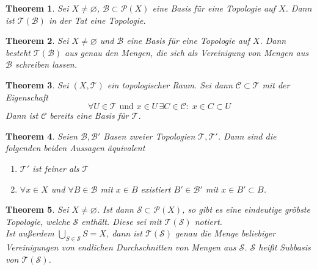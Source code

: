 \documentclass[a4paper, 12pt]{article}
\theoremstyle{plain}
\newtheorem{theorem}{Theorem}[section] %
\theoremstyle{definition}
\theoremstyle{lemma}
\theoremstyle{remark}
\theoremstyle{corollary}
\theoremstyle{example}
\begin{document}
	\begin{theorem}
		Sei $X \neq \varnothing$, $\mathcal{B} \subset \mathcal{P}(X)$ eine Basis für eine Topologie auf $X$. Dann ist $\mathcal{T}(\mathcal{B})$ in der Tat eine Topologie.
	\end{theorem}
	\begin{theorem}
		Sei $X \neq \varnothing$ und $\mathcal{B}$ eine Basis für eine Topologie auf $X$. Dann besteht $\mathcal{T}(\mathcal{B})$ aus genau den Mengen, die sich als Vereinigung von Mengen aus $\mathcal{B}$ schreiben lassen.
	\end{theorem}
	\begin{theorem}
		Sei $(X,\mathcal{T})$ ein topologischer Raum. Sei dann $\mathcal{C} \subset \mathcal{T}$ mit der Eigenschaft \[\forall U \in \mathcal{T} \text{ und } x \in U \, \exists C \in \mathcal{C}: \; x \in C \subset U\]
		Dann ist $\mathcal{C}$ bereits eine Basis für $\mathcal{T}$.
	\end{theorem}
	\begin{theorem}
		Seien $\mathcal{B}, \mathcal{B}'$ Basen zweier Topologien $\mathcal{T}, \mathcal{T}'$. Dann sind die folgenden beiden Aussagen äquivalent \begin{enumerate}
			\item $\mathcal{T}'$ ist feiner als $\mathcal{T}$
			\item $\forall x \in X$ und $\forall B \in \mathcal{B}$ mit $x\in B$ existiert $B'\in \mathcal{B}'$ mit $x\in B' \subset B$.
		\end{enumerate}
	\end{theorem}
	\begin{theorem}
		Sei $X \neq \varnothing$. Ist dann $\mathcal{S}\subset \mathcal{P}(X)$, so gibt es eine eindeutige gröbste Topologie, welche $\mathcal{S}$ enthält. Diese sei mit $\mathcal{T}(\mathcal{S})$ notiert.\\
		Ist außerdem $\bigcup_{S \in \mathcal{S}} S = X$, dann ist $\mathcal{T}(\mathcal{S})$ genau die Menge beliebiger Vereinigungen von endlichen Durchschnitten von Mengen aus $\mathcal{S}$. $\mathcal{S}$ heißt Subbasis von $\mathcal{T}(\mathcal{S})$.
	\end{theorem}
\end{document}
